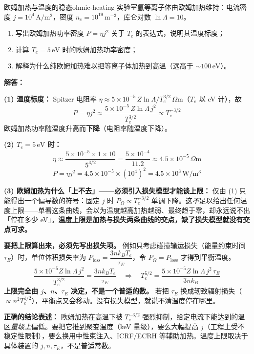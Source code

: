 \begin{example}{欧姆加热与温度的稳态}{ohmic-heating}
实验室氩等离子体由欧姆加热维持：电流密度 $j = 10^4\,\mathrm{A/m^2}$，密度 $n_e = 10^{19}\,\mathrm{m^{-3}}$，库仑对数 $\ln\Lambda = 10$。
\begin{enumerate}[label=(\arabic*)]
\item 写出欧姆加热功率密度 $P = \eta j^2$ 关于 $T_e$ 的表达式，说明其温度标度；
\item 计算 $T_e = 5\,\mathrm{eV}$ 时的欧姆加热功率密度；
\item 解释为什么纯欧姆加热难以把等离子体加热到高温（远高于 $\sim100\,\mathrm{eV}$）。
\end{enumerate}
\tcblower
\textbf{解答：}

\textbf{(1) 温度标度：} Spitzer 电阻率 $\eta \approx 5\times10^{-5}\,Z\ln\Lambda/T_e^{3/2}\,\Omega\mathrm{m}$（$T_e$ 以 eV 计），故
\[
P = \eta j^2 \approx \frac{5\times10^{-5}\,Z\ln\Lambda\,j^2}{T_e^{3/2}} \propto T_e^{-3/2}
\]
欧姆加热功率随温度升高而\textbf{下降}（电阻率随温度下降）。

\textbf{(2) $T_e = 5\,\mathrm{eV}$ 时：}
\[
\eta \approx \frac{5\times10^{-5}\times1\times10}{5^{3/2}} = \frac{5\times10^{-4}}{11.2} \approx 4.5\times10^{-5}\,\Omega\mathrm{m}
\]
\[
P = \eta j^2 = 4.5\times10^{-5}\times(10^4)^2 = 4.5\times10^3\,\mathrm{W/m^3}
\]

\textbf{(3) 欧姆加热为什么「上不去」——必须引入损失模型才能谈上限：}
仅由 (1) 只能得出一个偏导数的符号：固定 $j$ 时 $P_\Omega\propto T_e^{-3/2}$ 单调下降。这\emph{不}足以给出任何温度上限——单看这条曲线，会以为温度越高加热越弱、最终趋于零，却永远说不出「停在多少 eV」。\textbf{温度上限是加热与损失两条曲线的交点，缺了损失模型就没有交点可求。}

\textbf{要把上限算出来，必须先写出损失项。} 例如只考虑碰撞输运损失（能量约束时间 $\tau_E$）时，单位体积损失率为 $P_{\text{loss}} = \dfrac{3nk_{\!B}T_e}{\tau_E}$，令 $P_\Omega=P_{\text{loss}}$ 才得到平衡温度。
\[
\frac{5\times10^{-5}Z\ln\Lambda\,j^2}{T_e^{3/2}} = \frac{3nk_{\!B}T_e}{\tau_E}
\quad\Longrightarrow\quad
T_e^{5/2} = \frac{5\times10^{-5}Z\ln\Lambda\,j^2\,\tau_E}{3nk_{\!B}}
\]
\textbf{上限完全由 $j$、$n$、$\tau_E$ 决定，不是一个普适的数。} 若把 $\tau_E$ 换成轫致辐射损失（$\propto n^2T_e^{1/2}$），平衡点又会移动。没有损失模型，就说不清温度停在哪里。

\textbf{正确的结论表述：} 欧姆加热在高温下被 $T_e^{-3/2}$ 强烈抑制，给定电流下能达到的温区\emph{量级上}偏低。要把它推到聚变温度（keV 量级），要么大幅提高 $j$（工程上受不稳定性限制），要么换用中性束注入、ICRF/ECRH 等辅助加热。温度上限取决于具体装置的 $j,n,\tau_E$，不是普适常数。
\end{example}

